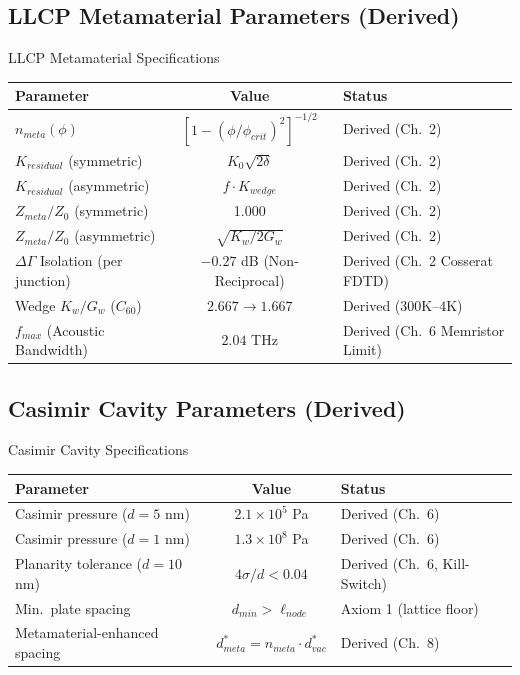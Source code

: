 \subsection{LLCP Metamaterial Parameters (Derived)}

\begin{designbox}{LLCP Metamaterial Specifications}
\begin{center}
\small
\begin{tabular}{l c l}
\hline\hline
\textbf{Parameter} & \textbf{Value} & \textbf{Status} \\
\hline
$n_{meta}(\phi)$ & $[1 - (\phi/\phi_{crit})^2]^{-1/2}$ & Derived (Ch.~2) \\
$K_{residual}$ (symmetric) & $K_0 \sqrt{2\delta}$ & Derived (Ch.~2) \\
$K_{residual}$ (asymmetric) & $f \cdot K_{wedge}$ & Derived (Ch.~2) \\
$Z_{meta}/Z_0$ (symmetric) & 1.000 & Derived (Ch.~2) \\
$Z_{meta}/Z_0$ (asymmetric) & $\sqrt{K_w/2G_w}$ & Derived (Ch.~2) \\
$\Delta \Gamma$ Isolation (per junction) & $-0.27$ dB (Non-Reciprocal) & Derived (Ch.~2 Cosserat FDTD) \\
Wedge $K_w/G_w$ ($C_{60}$) & $2.667 \to 1.667$ & Derived ($300$K--$4$K) \\
$f_{max}$ (Acoustic Bandwidth) & $2.04$ THz & Derived (Ch.~6 Memristor Limit) \\
\hline\hline
\end{tabular}
\end{center}
\end{designbox}

\subsection{Casimir Cavity Parameters (Derived)}

\begin{designbox}{Casimir Cavity Specifications}
\begin{center}
\small
\begin{tabular}{l c l}
\hline\hline
\textbf{Parameter} & \textbf{Value} & \textbf{Status} \\
\hline
Casimir pressure ($d = 5$ nm) & $2.1 \times 10^5$ Pa & Derived (Ch.~6) \\
Casimir pressure ($d = 1$ nm) & $1.3 \times 10^8$ Pa & Derived (Ch.~6) \\
Planarity tolerance ($d = 10$ nm) & $4\sigma/d < 0.04$ & Derived (Ch.~6, Kill-Switch) \\
Min.\ plate spacing & $d_{min} > \ell_{node}$ & Axiom 1 (lattice floor) \\
Metamaterial-enhanced spacing & $d^*_{meta} = n_{meta} \cdot d^*_{vac}$ & Derived (Ch.~8) \\
\hline\hline
\end{tabular}
\end{center}
\end{designbox}

